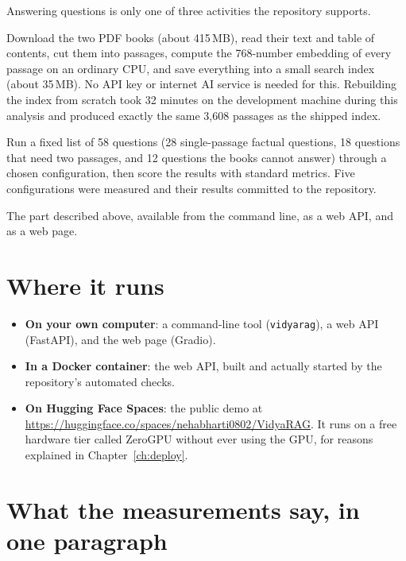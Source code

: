 Answering questions is only one of three activities the repository supports.

\begin{description}[style=nextline]
  \item[Preparation (``ingestion''), done once, offline, free.] Download the two PDF books (about 415\,MB), read their text and table of contents, cut them into passages, compute the 768-number embedding of every passage on an ordinary CPU, and save everything into a small search index (about 35\,MB). No API key or internet AI service is needed for this. Rebuilding the index from scratch took 32 minutes on the development machine during this analysis and produced exactly the same 3,608 passages as the shipped index.
  \item[Measurement (``evaluation''), done occasionally.] Run a fixed list of 58 questions (28 single-passage factual questions, 18 questions that need two passages, and 12 questions the books cannot answer) through a chosen configuration, then score the results with standard metrics. Five configurations were measured and their results committed to the repository.
  \item[Answering (``serving''), done on demand.] The part described above, available from the command line, as a web API, and as a web page.
\end{description}

\section{Where it runs}

\begin{itemize}
  \item \textbf{On your own computer}: a command-line tool (\texttt{vidyarag}), a web API (FastAPI), and the web page (Gradio).
  \item \textbf{In a Docker container}: the web API, built and actually started by the repository's automated checks.
  \item \textbf{On Hugging Face Spaces}: the public demo at \url{https://huggingface.co/spaces/nehabharti0802/VidyaRAG}. It runs on a free hardware tier called ZeroGPU without ever using the GPU, for reasons explained in Chapter~\ref{ch:deploy}.
\end{itemize}

\section{What the measurements say, in one paragraph}


